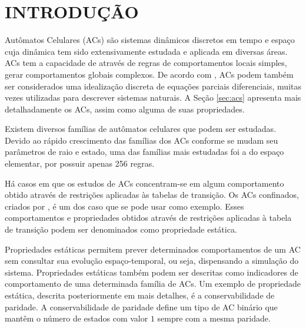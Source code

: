 \documentclass[12pt,a4paper]{article}
\let\stdsection\section
\renewcommand\section{\newpage\stdsection}
\begin{document}


\newpage
\pagestyle{plain}
\renewcommand{\baselinestretch}{1.4} 
\normalsize
\section{INTRODUÇÃO}\label{sec:introducao}
Autômatos Celulares (ACs) são sistemas dinâmicos discretos em tempo e espaço cuja dinâmica tem sido extensivamente estudada e aplicada em diversas áreas. ACs tem a capacidade de através de regras de comportamentos locais simples, gerar comportamentos globais complexos. De acordo com , ACs podem também ser considerados uma idealização discreta de equações parciais diferenciais, muitas vezes utilizadas para descrever sistemas naturais. A Seção \ref{sec:acs} apresenta mais detalhadamente os ACs, assim como alguma de suas propriedades.

Existem diversos famílias de autômatos celulares que podem ser estudadas. Devido ao rápido crescimento das famílias dos ACs conforme se mudam seu parâmetros de raio e estado, uma das famílias mais estudadas foi a do espaço elementar, por possuir apenas 256 regras.

Há casos em que os estudos de ACs concentram-se em algum comportamento obtido através de restrições aplicadas às tabelas de transição. Os ACs confinados, criados por , é um dos caso que se pode usar como exemplo. Esses comportamentos e propriedades obtidos através de restrições aplicadas à tabela de transição podem ser denominados como propriedade estática.

Propriedades estáticas permitem prever determinados comportamentos de um AC sem consultar sua evolução espaço-temporal, ou seja, dispensando a simulação do sistema. Propriedades estáticas também podem ser descritas como indicadores de comportamento de uma determinada família de ACs. Um exemplo de propriedade estática, descrita posteriormente em mais detalhes, é a conservabilidade de paridade. A conservabilidade de paridade define um tipo de AC binário que mantêm o número de estados com valor $1$ sempre com a mesma paridade.
\end{document}
